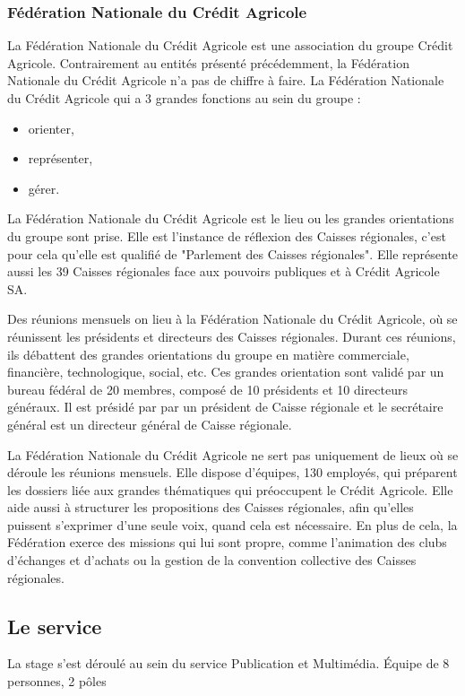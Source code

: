\documentclass[12pt,a4paper]{article}
\begin{document}
\subsubsection{Fédération Nationale du Crédit Agricole}
La Fédération Nationale du Crédit Agricole est une association du groupe Crédit Agricole. Contrairement au entités présenté précédemment, la Fédération Nationale du Crédit Agricole n'a pas de chiffre à faire. La Fédération Nationale du Crédit Agricole qui a 3 grandes fonctions au sein du groupe : 
\begin{itemize}
\item orienter,
\item représenter,
\item gérer.
\end{itemize}
La Fédération Nationale du Crédit Agricole est le lieu ou les grandes orientations du groupe sont prise. Elle est l'instance de réflexion des Caisses régionales, c'est pour cela qu'elle est qualifié de "Parlement des Caisses régionales". Elle représente aussi les 39 Caisses régionales face aux pouvoirs publiques et à Crédit Agricole SA.\par 
\bigskip
Des réunions mensuels on lieu à la Fédération Nationale du Crédit Agricole, où se réunissent les présidents et directeurs des Caisses régionales. Durant ces réunions, ils débattent des grandes orientations du groupe en matière commerciale, financière, technologique, social, etc. Ces grandes orientation sont validé par un bureau fédéral de 20 membres, composé de 10 présidents et 10 directeurs généraux. Il est présidé par par un président de Caisse régionale et le secrétaire général est un directeur général de Caisse régionale.\par 
\bigskip
La Fédération Nationale du Crédit Agricole ne sert pas uniquement de lieux où se déroule les réunions mensuels. Elle dispose d'équipes, 130 employés, qui préparent les dossiers liée aux grandes thématiques qui préoccupent le Crédit Agricole. Elle aide aussi à structurer les propositions des Caisses régionales, afin qu'elles puissent s'exprimer d'une seule voix, quand cela est nécessaire. En plus de cela, la Fédération exerce des missions qui lui sont propre, comme l'animation des clubs d'échanges et d'achats ou la gestion de la convention collective des Caisses régionales.\par

\subsection{Le service}
La stage s'est déroulé au sein du service Publication et Multimédia. Équipe de 8 personnes, 2 pôles\par
\end{document}
